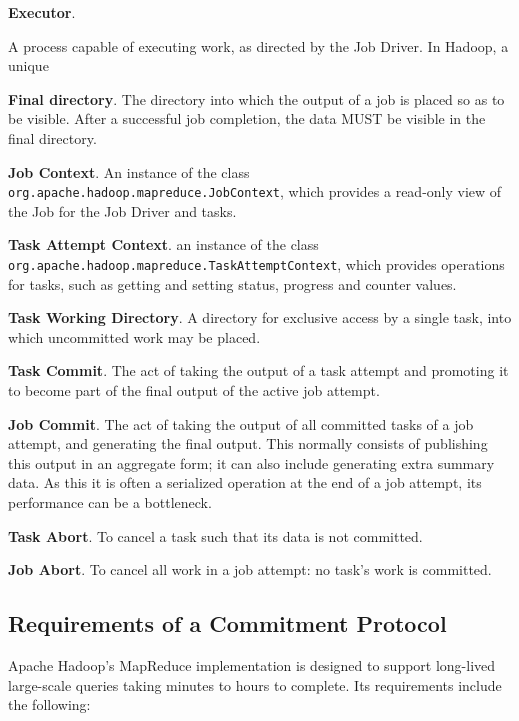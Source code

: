 \documentclass[conference]{IEEEtran}
\begin{document}
\textbf{Executor}.

A process capable of executing work, as directed by the Job Driver.
In Hadoop, a unique

\textbf{Final directory}.
The directory into which the output of a job is placed
so as to be visible.
After a successful job completion, the data MUST be visible in the final directory.


\textbf{Job Context}.
An instance of the class \texttt{org.apache.hadoop.mapreduce.JobContext},
which provides a read-only view of the Job for the Job Driver and tasks.

\textbf{Task Attempt Context}.
an instance of the class
\texttt{org.apache.hadoop.mapreduce.TaskAttemptContext},
which provides operations for tasks, such as getting and setting status,
progress and counter values.

\textbf{Task Working Directory}.
A directory for exclusive access by a single task,
into which uncommitted work may be placed.

\textbf{Task Commit}.
The act of taking the output of a task attempt and promoting it
to become part of the final output of the active job
attempt.

\textbf{Job Commit}.
The act of taking the output of all committed tasks of a job attempt,
and generating the final output.
This normally consists of publishing this output in an aggregate form;
it can also include generating extra summary data.
As this it is often a serialized operation at the end of a job attempt,
its performance can be a bottleneck.

\textbf{Task Abort}.
To cancel a task such that its data is not committed.

\textbf{Job Abort}.
To cancel all work in a job attempt: no task's work is committed.


\subsection{Requirements of a Commitment Protocol}
\label{subsec:requirementsOfACommitmentProtocol}

Apache Hadoop's MapReduce implementation is designed to support long-lived
large-scale queries taking minutes to hours to complete.
Its requirements include the following:
\end{document}
